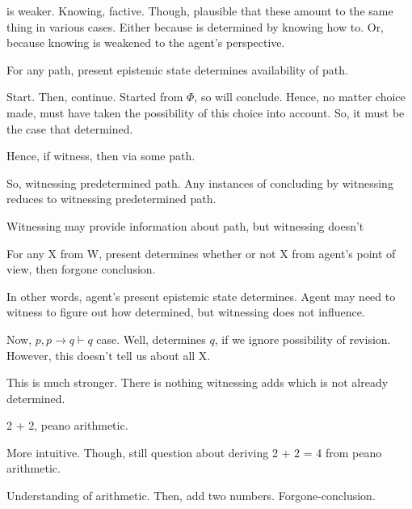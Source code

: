 \begin{note}[Weaken]
   is weaker.
  Knowing, factive.
  Though, plausible that these amount to the same thing in various cases.
  Either because \fc{} is determined by knowing how to.
  Or, because knowing is weakened to the agent's perspective.
\end{note}

\begin{note}
  \begin{proposition}
    For any path, present epistemic state determines availability of path.
  \end{proposition}

  Start.
  Then, continue.
  Started from \(\Phi\), so will conclude.
  Hence, no matter choice made, must have taken the possibility of this choice into account.
  So, it must be the case that determined.

  Hence, if witness, then via some path.

  So, witnessing predetermined path.
  Any instances of concluding by witnessing reduces to witnessing predetermined path.

  Witnessing may provide information about path, but witnessing doesn't 


  For any X from W,
  present determines whether or not X from agent's point of view, then forgone conclusion.

  In other words, agent's present epistemic state determines.
  Agent may need to witness to figure out how determined, but witnessing does not influence.
\end{note}

\begin{note}
  Now, \(p, p \rightarrow q \vdash q\) case.
  Well, determines \(q\), if we ignore possibility of revision.
  However, this doesn't tell us about all X.

  This is much stronger.
  There is nothing witnessing adds which is not already determined.

  2 + 2, peano arithmetic.

  More intuitive.
  Though, still question about deriving 2 + 2 = 4 from peano arithmetic.

  Understanding of arithmetic.
  Then, add two numbers.
  Forgone-conclusion.

\end{note}

